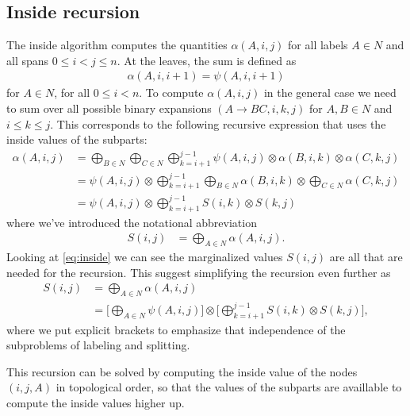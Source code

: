 \subsection{Inside recursion}
  The inside algorithm computes the quantities $\alpha(A,i,j)$ for all labels $A \in N$ and all spans $0 \leq i < j \leq n$. At the leaves, the sum is defined as
  \begin{align}
      \label{eq:inside-base}
      \alpha(A, i, i+1) = \psi(A, i, i+1)
  \end{align}
  for $A \in N$, for all $0 \leq i < n$. To compute $\alpha(A, i, j)$ in the general case we need to sum over all possible binary expansions $(A \to B C, i, k, j)$ for $A, B \in N$ and $i \leq k \leq j$. This corresponds to the following recursive expression that uses the inside values of the subparts:
  \begin{align*}
  \label{eq:inside}
    \alpha(A, i, j)
      &= \bigoplus_{B \in N} \bigoplus_{C \in N} \bigoplus_{k=i+1}^{j-1} \psi(A, i, j) \otimes \alpha(B,i,k) \otimes \alpha(C,k,j) \\
      &= \psi(A, i, j) \otimes \bigoplus_{k=i+1}^{j-1} \bigoplus_{B \in N} \alpha(B,i,k) \otimes \bigoplus_{C \in N} \alpha(C,k,j) \\
      &= \psi(A, i, j) \otimes \bigoplus_{k=i+1}^{j-1} S(i,k) \otimes S(k,j)
  \end{align*}
  where we've introduced the notational abbreviation
  \begin{align*}
      S(i,j) &= \bigoplus_{A \in N} \alpha(A,i,j).
  \end{align*}
  Looking at \ref{eq:inside} we can see the marginalized values $S(i, j)$ are all that are needed for the recursion. This suggest simplifying the recursion even further as
  \begin{align*}
  \label{eq:inside-simplified}
    S(i, j)
      &= \bigoplus_{A \in N} \alpha(A,i,j) \\
      &= \Bigg[ \bigoplus_{A \in N} \psi(A, i, j) \Bigg] \otimes \Bigg[\bigoplus_{k=i+1}^{j-1} S(i,k) \otimes  S(k,j) \Bigg],
  \end{align*}
  where we put explicit brackets to emphasize that independence of the subproblems of labeling and splitting.

  This recursion can be solved by computing the inside value of the nodes $(i, j, A)$ in topological order, so that the values of the subparts are availlable to compute the inside values higher up.

